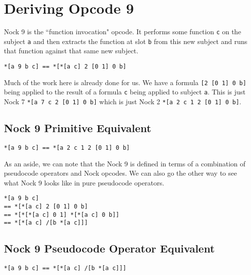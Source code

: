 \documentclass[twoside]{article}
\begin{document}
\section{Deriving Opcode 9}

Nock 9 is the ``function invocation" opcode. It performs some function \lstinline[style=inlinecode]{c} on the subject \lstinline[style=inlinecode]{a} and then extracts the function at slot \lstinline[style=inlinecode]{b} from this new subject and runs that function against that same new subject.

\begin{lstlisting}[style=listingcode]
*[a 9 b c] == *[*[a c] 2 [0 1] 0 b]
\end{lstlisting}

\noindent
Much of the work here is already done for us. We have a formula \lstinline[style=inlinecode]{[2 [0 1] 0 b]} being applied to the result of a formula \lstinline[style=inlinecode]{c} being applied to subject \lstinline[style=inlinecode]{a}. This is just Nock 7 \lstinline[style=inlinecode]{*[a 7 c 2 [0 1] 0 b]} which is just Nock 2
\lstinline[style=inlinecode]{*[a 2 c 1 2 [0 1] 0 b]}.

\subsection*{Nock 9 Primitive Equivalent}

\begin{lstlisting}[style=listingcode]
*[a 9 b c] == *[a 2 c 1 2 [0 1] 0 b]
\end{lstlisting}

As an aside, we can note that the Nock 9 is defined in terms of a combination of pseudocode operators and Nock opcodes. We can also go the other way to see what Nock 9 looks like in pure pseudocode operators.

\begin{lstlisting}[style=listingblock]
*[a 9 b c]
== *[*[a c] 2 [0 1] 0 b]
== *[*[*[a c] 0 1] *[*[a c] 0 b]]
== *[*[a c] /[b *[a c]]]
\end{lstlisting}

\subsection*{Nock 9 Pseudocode Operator Equivalent}

\begin{lstlisting}[style=listingcode]
*[a 9 b c] == *[*[a c] /[b *[a c]]]
\end{lstlisting}
\end{document}

